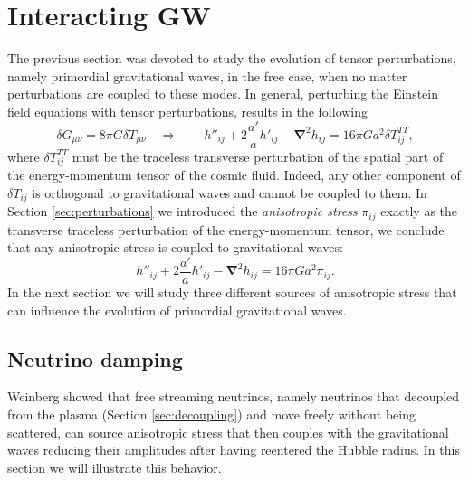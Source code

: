 \section{Interacting GW}
The previous section was devoted to study the evolution of tensor perturbations, namely primordial gravitational waves, in the free case, when no matter perturbations are coupled to these modes.
In general, perturbing the Einstein field equations with tensor perturbations, results in the following
$$\delta G_{\mu\nu}=8\pi G\delta T_{\mu\nu}\quad \Rightarrow\qquad h''_{ij}+2\frac{a'}{a}h'_{ij}-\boldsymbol{\nabla}^2 h_{ij}=16\pi G a^2\delta T_{ij}^{TT},$$
where $\delta T_{ij}^{TT}$ must be the traceless transverse perturbation of the spatial part of the energy-momentum tensor of the cosmic fluid. Indeed, any other component of $\delta T_{ij}$ is orthogonal to gravitational waves and cannot be coupled to them. In Section \ref{sec:perturbations} we introduced the \emph{anisotropic stress} $\pi_{ij}$ exactly as the transverse traceless perturbation of the energy-momentum tensor, we conclude that any anisotropic stress is coupled to gravitational waves:
\begin{equation}
    h''_{ij}+2\frac{a'}{a}h'_{ij}-\boldsymbol{\nabla}^2 h_{ij}=16\pi G a^2\pi_{ij}.\label{eq:GW_EOM_stress}
\end{equation}
In the next section we will study three different sources of anisotropic stress that can influence the evolution of primordial gravitational waves.
\subsection{Neutrino damping}
\label{sec:neutrino_damping}
 Weinberg \cite{Weinberg_nu_dump} showed that free streaming neutrinos, namely neutrinos that decoupled from the plasma (Section \ref{sec:decoupling}) and move freely without being scattered, can source anisotropic stress that then couples with the gravitational waves reducing their amplitudes after having reentered the Hubble radius. In this section we will illustrate this behavior.

